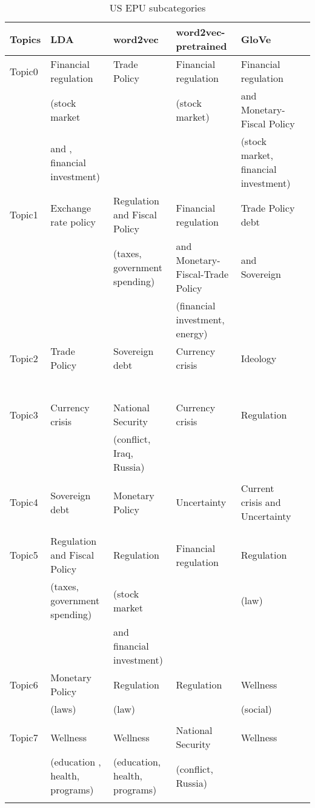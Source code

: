 \documentclass{article}
\begin{document}
\begin{table}[H]
\tiny
\resizebox{\textwidth}{!}
{ \begin{tabular}{llllll}
    \toprule
       Topics  & LDA &word2vec   & word2vec-pretrained & GloVe   \\
   \midrule
   Topic0 & Financial regulation & Trade Policy & Financial regulation & Financial regulation \\
   &(stock market& &(stock market)&and Monetary- Fiscal Policy\\
    & and , financial investment) &  &  & (stock market, financial investment)\\
    \hline
        Topic1 & Exchange rate policy & Regulation and Fiscal Policy & Financial regulation & Trade Policy  debt\\
        &&(taxes, government spending)&and Monetary- Fiscal-Trade Policy&and Sovereign\\
        
      & & &  (financial investment, energy) &\\
       \hline
        Topic2 & Trade Policy & Sovereign debt & Currency crisis & Ideology\\\
          &&&&\\
          & & &  &\\\\
           \hline
       Topic3 & Currency crisis& National Security & Currency crisis &  Regulation\\
       &&(conflict, Iraq, Russia)&&\\
         & & &  &\\
          \hline
       Topic4  & Sovereign debt &Monetary Policy& Uncertainty& Current crisis and Uncertainty\\
       &&&&\\
          & && & \\
           \hline
        Topic5 & Regulation and Fiscal Policy &Regulation &Financial regulation   & Regulation \\
         &  (taxes, government spending) &(stock market&  &  (law)\\
        &&and  financial investment)&&\\
          \hline
       Topic6 & Monetary Policy &Regulation& Regulation   &Wellness\\ 
         &(laws)&(law)&&(social)\\
         & & & &\\ 
          \hline
      Topic7 & Wellness &Wellness& National
Security &Wellness\\   

 & (education , health, programs)&(education, health, programs) &  (conflict, Russia)&\\   
  &&&&\\
\bottomrule
\end{tabular}}
\caption{US EPU subcategories}
\label{tab:US EPU subcategories}
\end{table}
\end{document}
